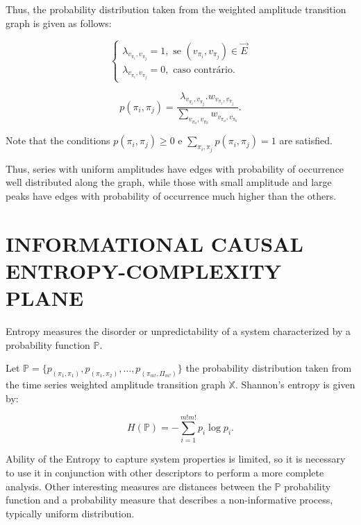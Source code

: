 \documentclass{isprs}
\begin{document}
	Thus, the probability distribution taken from the weighted amplitude transition graph is given as follows:
	
	\begin{equation}
	\left\{\begin{array}{l}
	\lambda_{v_{\pi_i}, v_{\pi_j}} = 1, \text{ se } (v_{\pi_i}, v_{\pi_j}) \in \vec{E} \\
	\lambda_{v_{\pi_i}, v_{\pi_j}} = 0, \text{ caso contrário}.
	\end{array}\right.
	\end{equation}
	
	\begin{equation}
	p(\pi_i, \pi_j) = \frac{\lambda_{v_{\pi_i}, v_{\pi_j}} . w_{v_{\pi_i}, v_{\pi_j}}}{\sum_{v_{\pi_a}, v_{\pi_b}} w_{v_{\pi_a}, v_{\pi_b}}}.
	\end{equation}
	
	Note that the conditions $p(\pi_i, \pi_j) \ge 0$ e $\sum_{\pi_i, \pi_j} p(\pi_i, \pi_j) = 1$ are satisfied.
	
	Thus, series with uniform amplitudes have edges with probability of occurrence well distributed along the graph, while those with small amplitude and large peaks have edges with probability of occurrence much higher than the others.
	
	\section{INFORMATIONAL CAUSAL ENTROPY-COMPLEXITY PLANE}\label{HC}
	
	Entropy measures the disorder or unpredictability of a system characterized by a probability function $\mathbb{P}$.
	
	Let $\mathbb{P} = \{p_{(\pi_1, \pi_1)}, p_{(\pi_1, \pi_2)}, \dots, p_{(\pi_{m!}, \Pi_{m!})} \}$  the probability distribution taken from the time series weighted amplitude transition graph $\mathbb{X}$.
	Shannon's entropy is given by:
	
	\begin{equation}
	H(\mathbb{P}) = -\sum_{i=1}^{m!m!} p_i \log p_i .
	\label{eq:Entropia}
	\end{equation}
	
	Ability of the Entropy to capture system properties is limited, so it is necessary to use it in conjunction with other descriptors to perform a more complete analysis.
	Other interesting measures are distances between the $\mathbb{P}$ probability function and a probability measure that describes a non-informative process, typically uniform distribution.
	
\end{document}
